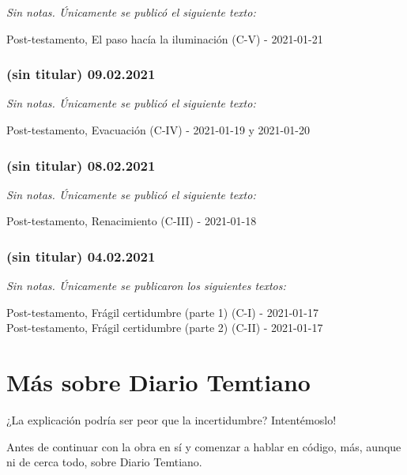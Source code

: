 \documentclass[
  spanish,
]{book}
\begin{document}
\emph{Sin notas. Únicamente se publicó el siguiente texto:}

Post-testamento, El paso hacía la iluminación (C-V) - 2021-01-21

\hypertarget{sin-titular-09.02.2021}{%
\subsection*{(sin titular) 09.02.2021}\label{sin-titular-09.02.2021}}

\emph{Sin notas. Únicamente se publicó el siguiente texto:}

Post-testamento, Evacuación (C-IV) - 2021-01-19 y 2021-01-20

\hypertarget{sin-titular-08.02.2021}{%
\subsection*{(sin titular) 08.02.2021}\label{sin-titular-08.02.2021}}

\emph{Sin notas. Únicamente se publicó el siguiente texto:}

Post-testamento, Renacimiento (C-III) - 2021-01-18

\hypertarget{sin-titular-04.02.2021}{%
\subsection*{(sin titular) 04.02.2021}\label{sin-titular-04.02.2021}}

\emph{Sin notas. Únicamente se publicaron los siguientes textos:}

Post-testamento, Frágil certidumbre (parte 1) (C-I) - 2021-01-17~\\
Post-testamento, Frágil certidumbre (parte 2) (C-II) - 2021-01-17

\hypertarget{muxe1s-sobre-diario-temtiano}{%
\chapter*{Más sobre Diario Temtiano}\label{muxe1s-sobre-diario-temtiano}}

¿La explicación podría ser peor que la incertidumbre? Intentémoslo!

Antes de continuar con la obra en sí y comenzar a hablar en código, más, aunque ni de cerca todo, sobre Diario Temtiano.
\end{document}
